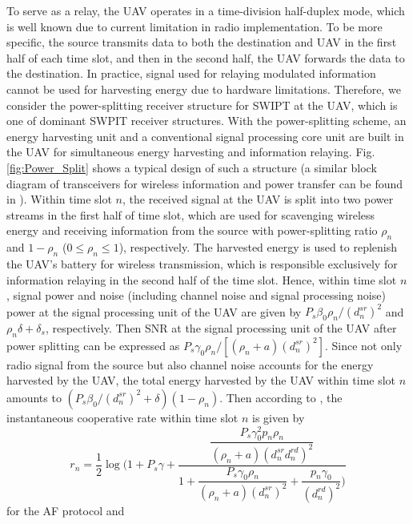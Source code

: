 \documentclass[12pt, draftclsnofoot, onecolumn]{IEEEtran}
\begin{document}
To serve as a relay, the UAV operates in a time-division half-duplex mode, which is well known due to current limitation in radio implementation. To be more specific, the source transmits data to both the destination and UAV in the first half of each time slot, and then in the second half, the UAV forwards the data to the destination\cite{1362898}. In practice, signal used for relaying modulated information cannot be used for harvesting energy due to hardware limitations\cite{6623062}. Therefore, we consider the power-splitting receiver structure for SWIPT at the UAV, which is one of dominant SWPIT receiver structures. With the power-splitting scheme, an energy harvesting unit and a conventional signal processing core unit are built in the UAV for simultaneous energy harvesting and information relaying. Fig. \ref{fig:Power_Split} shows a typical design of such a structure (a similar block diagram of transceivers for wireless information and power transfer can be found in \cite{6661329}). Within time slot $n$, the received signal at the UAV is split into two power streams in the first half of time slot, which are used for scavenging wireless energy and receiving information from the source with power-splitting ratio $\rho_{n}$ and $1-\rho_{n}$ ($0\leq\rho_{n}\leq 1$), respectively. The harvested energy is used to replenish the UAV's battery for wireless transmission, which is responsible exclusively for information relaying in the second half of the time slot. Hence, within time slot $n$, signal power and noise (including channel noise and signal processing noise) power at the signal processing unit of the UAV are given by $P_{s}\beta_{0}\rho_{n}/(d^{sr}_{n})^{2}$ and $\rho_{n}\delta +\delta_{s}$, respectively. Then SNR at the signal processing unit of the UAV after power splitting can be expressed as $P_{s}\gamma_{0}\rho_{n}/[(\rho_{n}+a)(d^{sr}_{n})^{2}]$. Since not only radio signal from the source but also channel noise accounts for the energy harvested by the UAV, the total energy harvested by the UAV within time slot $n$ amounts to $(P_{s}\beta_{0}/(d^{sr}_{n})^{2}+\delta)(1-\rho_{n})$. Then according to \cite{1362898}, the instantaneous cooperative rate within time slot $n$ is given by
\begin{equation}\label{eqt:af}
r_{n}=\dfrac{1}{2}\log(1+P_{s}\gamma +\dfrac{\dfrac{P_{s}\gamma_{0}^{2}p_{n}\rho_{n}}{(\rho_{n}+a)(d^{sr}_{n}d^{rd}_{n})^{2}}}{1+\dfrac{P_{s}\gamma_{0}\rho_{n}}{(\rho_{n}+a)(d^{sr}_{n})^{2}}+ \dfrac{p_{n}\gamma_{0}}{(d^{rd}_{n})^{2}})}
\end{equation}
for the AF protocol and 
\end{document}
